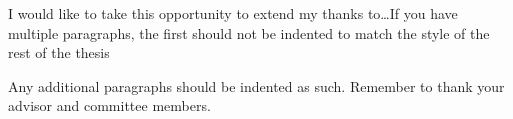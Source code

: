 \documentclass[12pt]{report}
\begin{document}
I would like to take this opportunity to extend my thanks to\ldots If you have multiple paragraphs, the first should not be indented to match the style of the rest of the thesis

\setlength{\parindent}{2em}
Any additional paragraphs should be indented as such.  Remember to thank your advisor and committee members.
%
%
%
%
\newpage
\setcounter{page}{1}
\setlength{\parindent}{2em}
%






%
\clearpage {} %
\renewcommand\baselinestretch{1.5}


%
%
%
%
%
%
\end{document}
